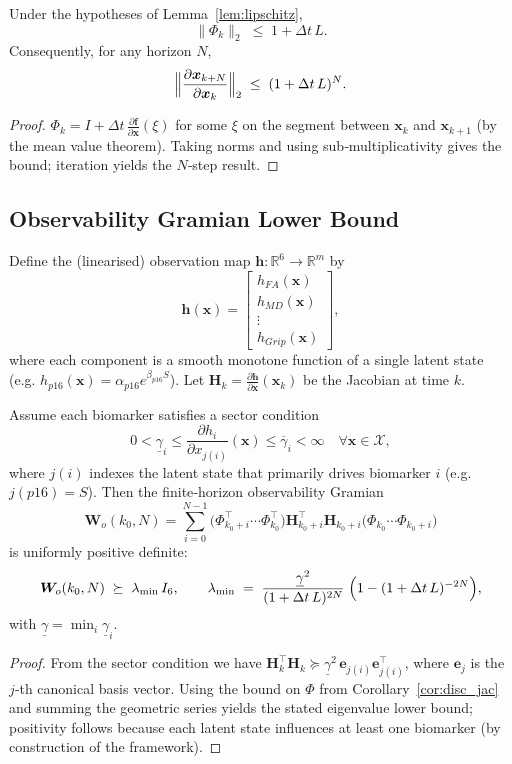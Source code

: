 \documentclass[11pt]{article}
\begin{document}
\begin{corollary}\label{cor:disc_jac}
Under the hypotheses of Lemma~\ref{lem:lipschitz},
\[
\|\Phi_{k}\|_{2}\;\le\;1+\Delta t\,L .
\]
Consequently, for any horizon $N$,
\[
\Bigl\|\frac{\partial\bm{x}_{k+N}}{\partial\bm{x}_{k}}\Bigr\|_{2}
\;\le\;(1+\Delta t\,L)^{N}.
\]
\end{corollary}
\begin{proof}
$\Phi_{k}=I+\Delta t\,\frac{\partial\bm{f}}{\partial\bm{x}}(\xi)$ for some $\xi$ on the segment between $\bm{x}_{k}$ and $\bm{x}_{k+1}$ (by the mean value theorem). Taking norms and using sub‑multiplicativity gives the bound; iteration yields the $N$‑step result.
\end{proof}

\subsection{Observability Gramian Lower Bound}
\label{sub:obs_gram}

Define the (linearised) observation map $\bm{h}:\mathbb{R}^{6}\to\mathbb{R}^{m}$ by
\[
\bm{h}(\bm{x})=
\begin{bmatrix}
  h_{FA}(\bm{x})\\
  h_{MD}(\bm{x})\\
  \vdots\\
  h_{Grip}(\bm{x})
\end{bmatrix},
\]
where each component is a smooth monotone function of a single latent state (e.g. $h_{p16}(\bm{x})=\alpha_{p16}e^{\beta_{p16}S}$). Let $\bm{H}_{k}=\frac{\partial\bm{h}}{\partial\bm{x}}(\bm{x}_{k})$ be the Jacobian at time $k$.

\begin{lemma}\label{lem:obs}
Assume each biomarker satisfies a sector condition
\[
0<\underline{\gamma}_{i}\le \frac{\partial h_{i}}{\partial x_{j(i)}}(\bm{x})\le\overline{\gamma}_{i}<\infty
\quad\forall\bm{x}\in\mathcal{X},
\]
where $j(i)$ indexes the latent state that primarily drives biomarker $i$ (e.g. $j(p16)=S$). Then the finite‑horizon observability Gramian
\[
\bm{W}_{o}(k_{0},N)=\sum_{i=0}^{N-1}\bigl(\Phi_{k_{0}+i}^{\top}\cdots\Phi_{k_{0}}^{\top}\bigr)
                    \bm{H}_{k_{0}+i}^{\top}\bm{H}_{k_{0}+i}
                    \bigl(\Phi_{k_{0}}\cdots\Phi_{k_{0}+i}\bigr)
\]
is uniformly positive definite:
\[
\bm{W}_{o}(k_{0},N)\;\succeq\;\lambda_{\min}\,I_{6},
\qquad
\lambda_{\min}
\;=\;
\frac{\underline{\gamma}^{2}}{(1+\Delta t\,L)^{2N}}
\;\Bigl(1-(1+\Delta t\,L)^{-2N}\Bigr),
\]
with $\underline{\gamma}=\min_{i}\underline{\gamma}_{i}$.
\end{lemma}
\begin{proof}
From the sector condition we have $\bm{H}_{k}^{\top}\bm{H}_{k}\succeq\underline{\gamma}^{2}\, \bm{e}_{j(i)}\bm{e}_{j(i)}^{\top}$, where $\bm{e}_{j}$ is the $j$‑th canonical basis vector. Using the bound on $\Phi$ from Corollary~\ref{cor:disc_jac} and summing the geometric series yields the stated eigenvalue lower bound; positivity follows because each latent state influences at least one biomarker (by construction of the framework).
\end{proof}
\end{document}
